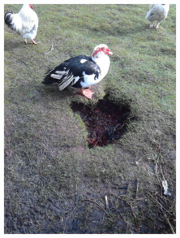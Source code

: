 \documentclass{l4proj}
\begin{document}
\begin{figure}[ht]
\begin{subfigure}[h!]{0.18\textwidth}
    \includegraphics[width=\textwidth, trim={0cm 6cm 0cm 6cm}, clip]{images/dataset/ugly_duck/rgb.png}

\end{subfigure}
\end{figure}
\end{document}
